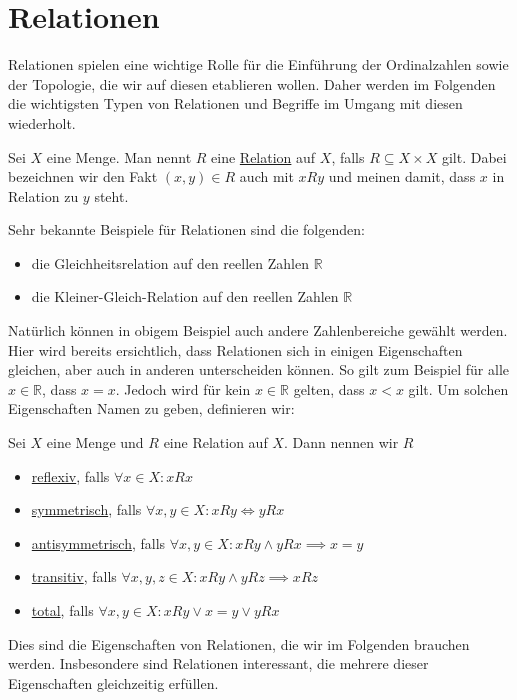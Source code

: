 \documentclass[11pt]{scrartcl}
\newcommand{\R}{\mathbb{R}}
\begin{document}
\section{Relationen}
Relationen spielen eine wichtige Rolle für die Einführung der Ordinalzahlen sowie der Topologie, die wir auf diesen etablieren wollen. Daher werden im Folgenden die wichtigsten Typen von Relationen und Begriffe
im Umgang mit diesen wiederholt.
\begin{definition}
	Sei $X$ eine Menge. Man nennt $R$ eine \underline{Relation} auf $X$, falls $R \subseteq X \times X$ gilt. Dabei bezeichnen wir den Fakt $(x,y)\in R$ auch mit $xRy$ und meinen damit, dass $x$ in Relation zu $y$ steht.
\end{definition}
\begin{example}
	Sehr bekannte Beispiele für Relationen sind die folgenden:
	\begin{itemize}
		\item die Gleichheitsrelation auf den reellen Zahlen $\R$
		\item die Kleiner-Gleich-Relation auf den reellen Zahlen $\R$
	\end{itemize}
\end{example}
Natürlich können in obigem Beispiel auch andere Zahlenbereiche gewählt werden. Hier wird bereits ersichtlich, dass Relationen sich in einigen Eigenschaften gleichen, aber auch in anderen unterscheiden können. So gilt zum Beispiel für alle $x\in\R$, dass $x=x$. Jedoch wird für kein $x\in\R$ gelten, dass $x<x$ gilt. Um solchen Eigenschaften Namen zu geben, definieren wir:
\begin{definition}
	Sei $X$ eine Menge und $R$ eine Relation auf $X$. Dann nennen wir $R$
	\begin{itemize}
		\item \underline{reflexiv}, falls $\forall x\in X: xRx$
		\item \underline{symmetrisch}, falls $\forall x,y\in X: xRy \iff yRx$
		\item \underline{antisymmetrisch}, falls $\forall x,y\in X: xRy \land yRx \implies x=y$
		\item \underline{transitiv}, falls $\forall x,y,z\in X: xRy \land yRz\implies xRz$
		\item \underline{total}, falls $\forall  x,y\in X: xRy \lor x=y \lor yRx$
	\end{itemize}
\end{definition}
\noindent Dies sind die Eigenschaften von Relationen, die wir im Folgenden brauchen werden. Insbesondere sind Relationen interessant, die mehrere dieser Eigenschaften gleichzeitig erfüllen.
\end{document}

